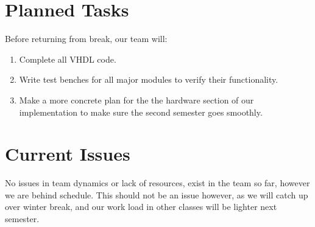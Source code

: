 \documentclass[paper=usletter, fontsize=12pt]{article}
\begin{document}
    \section{Planned Tasks}
    Before returning from break, our team will:
    \begin{enumerate}[label=\alph*)]


        \item Complete all VHDL code.

        \item Write test benches for all major modules to verify their 
        functionality.

        \item Make a more concrete plan for the the hardware section of our 
        implementation to make sure the second semester goes smoothly.

    \end{enumerate}

    \section{Current Issues} No issues in team dynamics or lack of resources,
    exist in the team so far, however we are behind schedule. This should not
    be an issue however, as we will catch up over winter break, and our work
    load in other classes will be lighter next semester.
   
\end{document}
